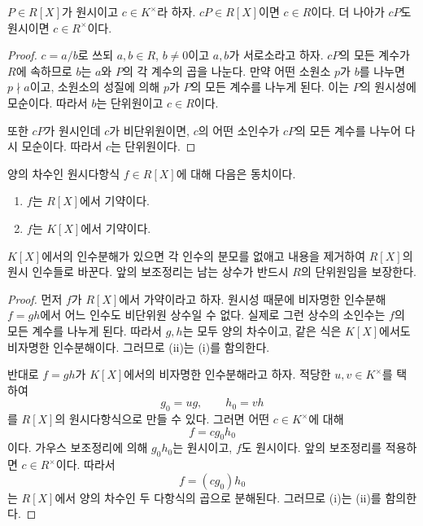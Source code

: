 \begin{lemma}
$P\in R[X]$가 원시이고 $c\in K^\times$라 하자. $cP\in R[X]$이면 $c\in R$이다. 더 나아가 $cP$도 원시이면 $c\in R^\times$이다.
\end{lemma}

\begin{proof}
$c=a/b$로 쓰되 $a,b\in R$, $b\ne0$이고 $a,b$가 서로소라고 하자. $cP$의 모든 계수가 $R$에 속하므로 $b$는 $a$와 $P$의 각 계수의 곱을 나눈다. 만약 어떤 소원소 $p$가 $b$를 나누면 $p\nmid a$이고, 소원소의 성질에 의해 $p$가 $P$의 모든 계수를 나누게 된다. 이는 $P$의 원시성에 모순이다. 따라서 $b$는 단위원이고 $c\in R$이다.

또한 $cP$가 원시인데 $c$가 비단위원이면, $c$의 어떤 소인수가 $cP$의 모든 계수를 나누어 다시 모순이다. 따라서 $c$는 단위원이다.
\end{proof}

\begin{theorem}
양의 차수인 원시다항식 $f\in R[X]$에 대해 다음은 동치이다.
\begin{enumerate}[label=(\roman*)]
  \item $f$는 $R[X]$에서 기약이다.
  \item $f$는 $K[X]$에서 기약이다.
\end{enumerate}
\end{theorem}

\begin{proofidea}
$K[X]$에서의 인수분해가 있으면 각 인수의 분모를 없애고 내용을 제거하여 $R[X]$의 원시 인수들로 바꾼다. 앞의 보조정리는 남는 상수가 반드시 $R$의 단위원임을 보장한다.
\end{proofidea}

\begin{proof}
먼저 $f$가 $R[X]$에서 가약이라고 하자. 원시성 때문에 비자명한 인수분해 $f=gh$에서 어느 인수도 비단위원 상수일 수 없다. 실제로 그런 상수의 소인수는 $f$의 모든 계수를 나누게 된다. 따라서 $g,h$는 모두 양의 차수이고, 같은 식은 $K[X]$에서도 비자명한 인수분해이다. 그러므로 (ii)는 (i)를 함의한다.

반대로 $f=gh$가 $K[X]$에서의 비자명한 인수분해라고 하자. 적당한 $u,v\in K^\times$를 택하여
\[
  g_0=ug,
  \qquad
  h_0=vh
\]
를 $R[X]$의 원시다항식으로 만들 수 있다. 그러면 어떤 $c\in K^\times$에 대해
\[
  f=cg_0h_0
\]
이다. 가우스 보조정리에 의해 $g_0h_0$는 원시이고, $f$도 원시이다. 앞의 보조정리를 적용하면 $c\in R^\times$이다. 따라서
\[
  f=(cg_0)h_0
\]
는 $R[X]$에서 양의 차수인 두 다항식의 곱으로 분해된다. 그러므로 (i)는 (ii)를 함의한다.
\end{proof}

